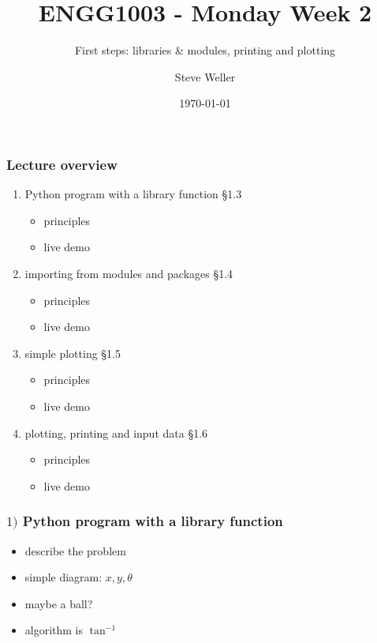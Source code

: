 \documentclass[14pt]{beamer}
\title{ENGG1003 - Monday Week 2}
\subtitle{First steps: libraries \& modules, printing and plotting}
\author{Steve Weller}
\institute{University of Newcastle}
\date{\today}
\newcommand\red[1]{{\color{red} #1}}
\begin{document}
\titlepage


\begin{frame}[fragile]
\frametitle{Lecture overview}
\begin{enumerate}
\item Python program with a library function \red{\S1.3}
	\begin{itemize}
		\item principles
		\item live demo
	\end{itemize}
\item importing from modules and packages \red{\S1.4}
		\begin{itemize}
		\item principles
		\item live demo
	\end{itemize}
	
\item simple plotting \red{\S1.5} 
	\begin{itemize}
			\item principles
		\item live demo
	\end{itemize}
	
\item plotting, printing and input data \red{\S1.6}
	\begin{itemize}
	\item principles
	\item live demo
	\end{itemize}
\end{enumerate}

\end{frame}


\begin{frame}[fragile]
\frametitle{$1)$ Python program with a library function}
\begin{itemize}
\item describe the problem
\item simple diagram: $x, y, \theta$
\item maybe a ball?
\item algorithm is $\tan^{-1}$
\end{itemize}
\end{frame}
\end{document}
